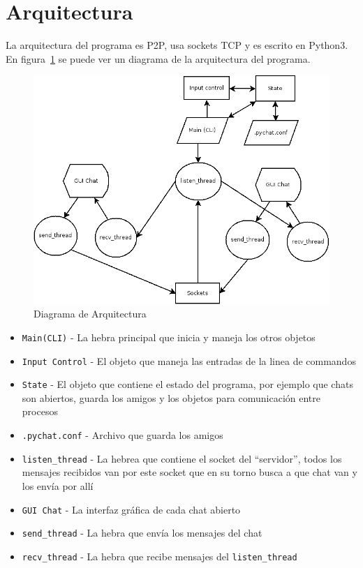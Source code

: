 \documentclass[a4paper, 12pt]{article}
\begin{document}
\section{Arquitectura}
La arquitectura del programa es P2P, usa sockets TCP y es escrito en Python3.
En figura~\ref{fig:arch} se puede ver un diagrama de la arquitectura del
programa.
\begin{figure}[hb]
        \centering
        \includegraphics[width=\textwidth]{../imagenes/architecture.png}
        \caption{Diagrama de Arquitectura}
        \label{fig:arch}
\end{figure}
\begin{itemize}
        \item \texttt{Main(CLI)} - La hebra principal que inicia y maneja los otros
                objetos
        \item \texttt{Input Control} - El objeto que maneja las entradas de la linea de
                commandos
        \item \texttt{State} - El objeto que contiene el estado del programa, por
                ejemplo que chats son abiertos, guarda los amigos y los objetos
                para comunicación entre procesos
        \item \texttt{.pychat.conf} - Archivo que guarda los amigos

        \item \texttt{listen\_thread} - La hebrea que contiene el socket del ``servidor'',
                todos los mensajes recibidos van por este socket que en su torno
                busca a que chat van y los envía por allí
        \item \texttt{GUI Chat} - La interfaz gráfica de cada chat abierto
        \item \texttt{send\_thread} - La hebra que envía los mensajes del chat
        \item \texttt{recv\_thread} - La hebra que recibe mensajes del
                \texttt{listen\_thread}
\end{itemize}
\end{document}
